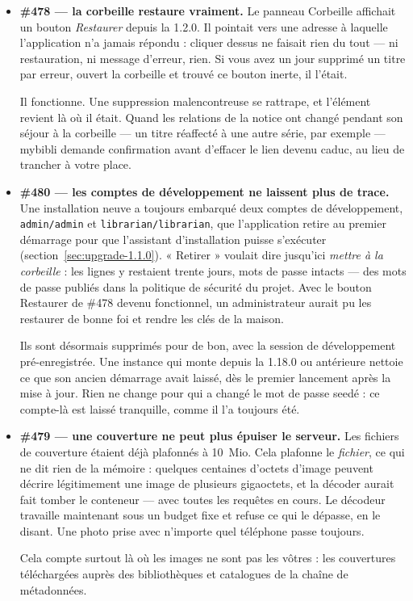 \begin{itemize}
  \item \textbf{\#478 \string— la corbeille restaure vraiment.} Le
        panneau Corbeille affichait un bouton \emph{Restaurer} depuis la
        1.2.0. Il pointait vers une adresse à laquelle l'application n'a
        jamais répondu : cliquer dessus ne faisait rien du tout --- ni
        restauration, ni message d'erreur, rien. Si vous avez un jour
        supprimé un titre par erreur, ouvert la corbeille et trouvé ce
        bouton inerte, il l'était.

        Il fonctionne. Une suppression malencontreuse se rattrape, et
        l'élément revient là où il était. Quand les relations de la
        notice ont changé pendant son séjour à la corbeille --- un titre
        réaffecté à une autre série, par exemple --- mybibli demande
        confirmation avant d'effacer le lien devenu caduc, au lieu de
        trancher à votre place.

  \item \textbf{\#480 \string— les comptes de développement ne laissent
        plus de trace.} Une installation neuve a toujours embarqué deux
        comptes de développement, \texttt{admin/admin} et
        \texttt{librarian/librarian}, que l'application retire au premier
        démarrage pour que l'assistant d'installation puisse s'exécuter
        (section~\ref{sec:upgrade-1.1.0}). « Retirer » voulait dire
        jusqu'ici \emph{mettre à la corbeille} : les lignes y restaient
        trente jours, mots de passe intacts --- des mots de passe publiés
        dans la politique de sécurité du projet. Avec le bouton
        Restaurer de \#478 devenu fonctionnel, un administrateur aurait
        pu les restaurer de bonne foi et rendre les clés de la maison.

        Ils sont désormais supprimés pour de bon, avec la session de
        développement pré-enregistrée. Une instance qui monte depuis la
        1.18.0 ou antérieure nettoie ce que son ancien démarrage avait
        laissé, dès le premier lancement après la mise à jour. Rien ne
        change pour qui a changé le mot de passe seedé : ce compte-là est
        laissé tranquille, comme il l'a toujours été.

  \item \textbf{\#479 \string— une couverture ne peut plus épuiser le
        serveur.} Les fichiers de couverture étaient déjà plafonnés à
        10~Mio. Cela plafonne le \emph{fichier}, ce qui ne dit rien de la
        mémoire : quelques centaines d'octets d'image peuvent décrire
        légitimement une image de plusieurs gigaoctets, et la décoder
        aurait fait tomber le conteneur --- avec toutes les requêtes en
        cours. Le décodeur travaille maintenant sous un budget fixe et
        refuse ce qui le dépasse, en le disant. Une photo prise avec
        n'importe quel téléphone passe toujours.

        Cela compte surtout là où les images ne sont pas les vôtres :
        les couvertures téléchargées auprès des bibliothèques et
        catalogues de la chaîne de métadonnées.
\end{itemize}

